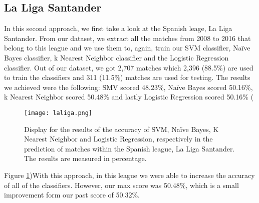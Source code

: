 \documentclass[10pt,journal,compsoc]{IEEEtran}
\begin{document}
\subsection{La Liga Santander}
In this second approach, we first take a look at the Spanish leage, La Liga Santander. From our dataset, we extract all the matches from 2008 to 2016 that belong to this league and we use them to, again, train our SVM classifier, Naïve Bayes classifier, k Nearest Neighbor classifier and the Logistic Regression classifier. Out of our dataset, we got 2,707 matches which 2,396 (88.5\%) are used to train the classifiers and 311 (11.5\%) matches are used for testing. The results we achieved were the following: SMV scored 48.23\%, Naïve Bayes scored 50.16\%, k Nearest Neighbor scored 50.48\% and lastly Logistic Regression scored 50.16\% (\begin{figure}
  \texttt{[image: laliga.png]}
  \caption{Display for the results of the accuracy of SVM, Naïve Bayes, K Nearest Neighbor and Logistic Regression, respectively in the prediction of matches within the Spanish league, La Liga Santander. The results are measured in percentage.}
  \label{fig:laliga}
\end{figure}
Figure \ref{fig:laliga})With this approach, in this league we were able to increase the accuracy of all of the classifiers. However, our max score was 50.48\%, which is a small improvement form our past score of 50.32\%.
\end{document}
